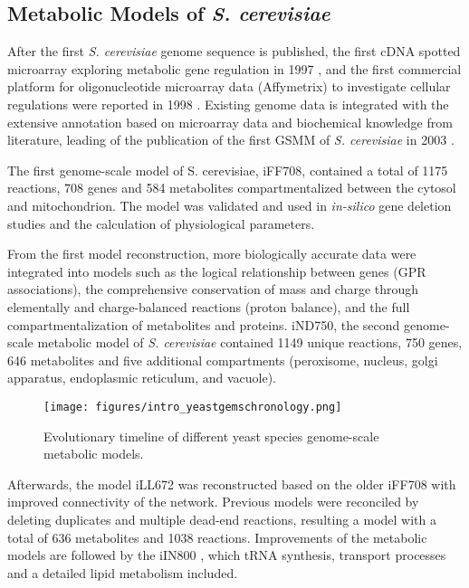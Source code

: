 \subsection{Metabolic Models of \emph{S. cerevisiae}}
After the first \emph{S. cerevisiae} genome sequence is published, the first cDNA spotted microarray exploring metabolic gene regulation in 1997 \cite{derisi1997exploring}, and the first commercial platform for oligonucleotide microarray data (Affymetrix) to investigate cellular regulations were reported in 1998 \cite{cho1998parallel}. Existing genome data is integrated with the extensive annotation based on microarray data and biochemical knowledge from literature, leading of the publication of the first GSMM of \emph{S. cerevisiae} in 2003 \cite{forster2003genome}.

The first genome-scale model of S. cerevisiae, iFF708, contained a total of 1175 reactions, 708 genes and 584 metabolites compartmentalized between the cytosol and mitochondrion. The model was validated and used in \emph{in-silico} gene deletion studies\cite{forster2003large} and the calculation of physiological parameters\cite{famili2003saccharomyces}.

From the first model reconstruction, more biologically accurate data were integrated into models such as the logical relationship between genes (GPR associations), the comprehensive conservation of mass and charge through elementally and charge-balanced reactions (proton balance), and the full compartmentalization of metabolites and proteins. iND750, the second genome-scale metabolic model of \emph{S. cerevisiae} contained 1149 unique reactions, 750	genes, 646 metabolites and five additional compartments (peroxisome, nucleus, golgi apparatus, endoplasmic reticulum, and vacuole)\cite{duarte2004reconstruction}.

\begin{figure}[H]
\texttt{[image: figures/intro\_yeastgemschronology.png]}
\caption[Evolutionary timeline of different yeast species genome-scale metabolic models]{Evolutionary timeline of different yeast species genome-scale metabolic models.}
\label{fig:intro_yeastgemschronology}
\end{figure}

Afterwards, the model iLL672 was reconstructed based on the older iFF708 with improved connectivity of the network\cite{kuepfer2005metabolic}. Previous models were reconciled by deleting duplicates and multiple dead-end reactions, resulting a model with a total of 636 metabolites and 1038 reactions. Improvements of the metabolic models are followed by the iIN800 \cite{nookaew2008genome}, which tRNA synthesis, transport processes and a detailed lipid metabolism included.

